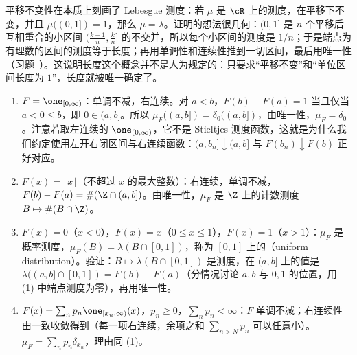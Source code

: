 \begin{remark}
平移不变性在本质上刻画了 Lebesgue 测度：若 $\mu$ 是 $\cR$ 上的测度，在平移下不变，并且 $\mu((0,1])=1$，那么 $\mu=\lambda$。证明的想法很几何：$(0,1]$ 是 $n$ 个平移后互相重合的小区间 $(\frac{k-1}n,\frac kn]$ 的不交并，所以每个小区间的测度是 $1/n$；于是端点为有理数的区间的测度等于长度；再用单调性和连续性推到一切区间，最后用唯一性（习题~）。这说明长度这个概念并不是人为规定的：只要求“平移不变”和“单位区间长度为 $1$”，长度就被唯一确定了。
\end{remark}

\begin{example}\label{ex:extension:LS-examples}
\begin{enumerate}
\item $F=\one_{[0,\infty)}$：单调不减，右连续。对 $a<b$，$F(b)-F(a)=1$ 当且仅当 $a<0\leqslant b$，即 $0\in(a,b]$。所以 $\mu_F((a,b])=\delta_0((a,b])$，由唯一性，$\mu_F=\delta_0$。注意若取左连续的 $\one_{(0,\infty)}$，它不是 Stieltjes 测度函数，这就是为什么我们约定使用左开右闭区间与右连续函数：$(a,b_n]\downarrow(a,b]$ 与 $F(b_n)\downarrow F(b)$ 正好对应。
\item $F(x)=\lfloor x\rfloor$（不超过 $x$ 的最大整数）：右连续，单调不减，$F(b)-F(a)=\#(\Z\cap(a,b])$。由唯一性，$\mu_F$ 是 $\Z$ 上的计数测度 $B\mapsto\#(B\cap\Z)$。
\item $F(x)=0$（$x<0$），$F(x)=x$（$0\leqslant x\leqslant1$），$F(x)=1$（$x>1$）：$\mu_F$ 是概率测度，$\mu_F(B)=\lambda(B\cap[0,1])$，称为 $[0,1]$ 上的（uniform distribution）。验证：$B\mapsto\lambda(B\cap[0,1])$ 是测度，在 $(a,b]$ 上的值是 $\lambda((a,b]\cap[0,1])=F(b)-F(a)$（分情况讨论 $a,b$ 与 $0,1$ 的位置，用 (1) 中端点测度为零），再用唯一性。
\item $F(x)=\sum_np_n\one_{[x_n,\infty)}(x)$，$p_n\geqslant0$，$\sum_np_n<\infty$：$F$ 单调不减；右连续性由一致收敛得到（每一项右连续，余项之和 $\sum_{n>N}p_n$ 可以任意小）。$\mu_F=\sum_np_n\delta_{x_n}$，理由同 (1)。
\end{enumerate}
\end{example}

